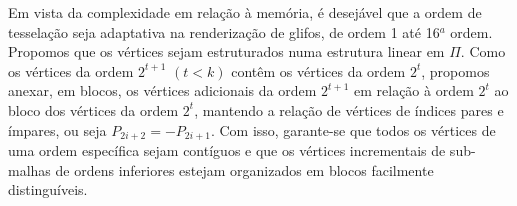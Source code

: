 



Em vista da complexidade em relação à memória, é desejável que a ordem de tesselação seja adaptativa na renderização de glifos, de ordem 1 até 16$^a$ ordem. Propomos que os vértices sejam estruturados numa estrutura linear em $\Pi$. Como os vértices da ordem $2^{t+1}$ $(t < k)$ contêm os vértices da ordem $2^{t}$, propomos anexar, em blocos, os vértices adicionais da ordem $2^{t+1}$ em relação à ordem $2^t$ ao bloco dos vértices da ordem $2^t$, mantendo a relação de vértices de índices pares e ímpares, ou seja $P_{2i+2} = -P_{2i+1}$. Com isso, garante-se que todos os vértices de uma ordem específica sejam contíguos e que os vértices incrementais de sub-malhas de ordens inferiores estejam organizados em blocos facilmente distinguíveis.

